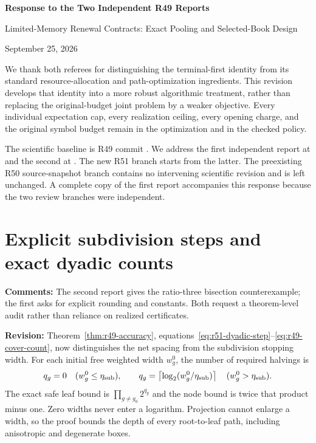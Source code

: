 \documentclass[11pt,letterpaper]{article}
\begin{document}
\begin{center}{\Large\bfseries Response to the Two Independent R49 Reports}\par
Limited-Memory Renewal Contracts: Exact Pooling and Selected-Book Design\par
September 25, 2026\end{center}
We thank both referees for distinguishing the terminal-first identity from its standard resource-allocation and path-optimization ingredients. This revision develops that identity into a more robust algorithmic treatment, rather than replacing the original-budget joint problem by a weaker objective. Every individual expectation cap, every realization ceiling, every opening charge, and the original symbol budget remain in the optimization and in the checked policy.

The scientific baseline is R49 commit . We address the first independent report at  and the second at . The new R51 branch starts from the latter. The preexisting R50 source-snapshot branch contains no intervening scientific revision and is left unchanged. A complete copy of the first report accompanies this response because the two review branches were independent.

\section{Explicit subdivision steps and exact dyadic counts}
\textbf{Comments:} The second report gives the ratio-three bisection counterexample; the first asks for explicit rounding and constants. Both request a theorem-level audit rather than reliance on realized certificates.

\textbf{Revision:} Theorem~\ref{thm:r49-accuracy}, equations~\eqref{eq:r51-dyadic-step}--\eqref{eq:r49-cover-count}, now distinguishes the net spacing from the subdivision stopping width. For each initial free weighted width $w_g^0$, the number of required halvings is
\[
 q_g=0\quad(w_g^0\leq\eta_{\rm sub}),\qquad
 q_g=\left\lceil\log_2(w_g^0/\eta_{\rm sub})\right\rceil
 \quad(w_g^0>\eta_{\rm sub}).
\]
The exact safe leaf bound is $\prod_{g\ne g_0}2^{q_g}$ and the node bound is twice that product minus one. Zero widths never enter a logarithm. Projection cannot enlarge a width, so the proof bounds the depth of every root-to-leaf path, including anisotropic and degenerate boxes.
\end{document}
